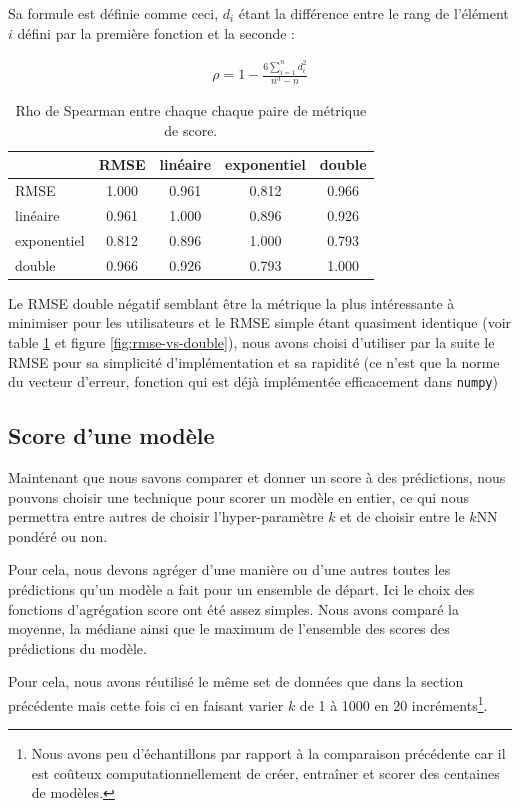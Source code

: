 \documentclass[letterpaper]{article}
\begin{document}
Sa formule est définie comme ceci, $d_i$ étant la différence entre le rang de l'élément $i$ défini par la première fonction et la seconde :

\begin{eqnarray}
\rho = 1 - \frac{6 \sum_{i=1}^{n} d^2_i}{n^3 - n}
\end{eqnarray}

\begin{table}[h]
\centering
\begin{tabular}{|l|c|c|c|c|}
  \hline
  & RMSE & linéaire & exponentiel & double \\
  \hline
RMSE & 1.000 & 0.961 & 0.812 & 0.966 \\
linéaire & 0.961 & 1.000 & 0.896 & 0.926 \\
exponentiel & 0.812 & 0.896 & 1.000 & 0.793 \\
double & 0.966 & 0.926 & 0.793 & 1.000 \\
  \hline
\end{tabular}
  \caption{\label{tab:rho} Rho de Spearman entre chaque chaque paire de métrique de score.}
\end{table}

Le RMSE double négatif semblant être la métrique la plus intéressante à minimiser pour les utilisateurs et le RMSE simple étant quasiment identique (voir table \ref{tab:rho} et figure \ref{fig:rmse-vs-double}), nous avons choisi d'utiliser par la suite le RMSE pour sa simplicité d'implémentation et sa rapidité (ce n'est que la norme du vecteur d'erreur, fonction qui est déjà implémentée efficacement dans \texttt{numpy})

\FloatBarrier
\subsection{Score d'une modèle}

Maintenant que nous savons comparer et donner un score à des prédictions, nous pouvons choisir une technique pour scorer un modèle en entier, ce qui nous permettra entre autres de choisir l'hyper-paramètre $k$ et de choisir entre le $k$NN pondéré ou non.

Pour cela, nous devons agréger d'une manière ou d'une autres toutes les prédictions qu'un modèle a fait pour un ensemble de départ. Ici le choix des fonctions d’agrégation score ont été assez simples. Nous avons comparé la moyenne, la médiane ainsi que le maximum de l'ensemble des scores des prédictions du modèle.

Pour cela, nous avons réutilisé le même set de données que dans la section précédente mais cette fois ci en faisant varier $k$ de 1 à 1000 en 20 incréments\footnote{Nous avons peu d’échantillons par rapport à la comparaison précédente car il est coûteux computationnellement de créer, entraîner et scorer des centaines de modèles.}.
\end{document}
